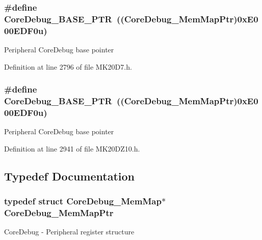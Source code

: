 \subsubsection[{\texorpdfstring{Core\+Debug\+\_\+\+B\+A\+S\+E\+\_\+\+P\+TR}{CoreDebug_BASE_PTR}}]{\setlength{\rightskip}{0pt plus 5cm}\#define Core\+Debug\+\_\+\+B\+A\+S\+E\+\_\+\+P\+TR~(({\bf Core\+Debug\+\_\+\+Mem\+Map\+Ptr})0x\+E000\+E\+D\+F0u)}\hypertarget{group___core_debug___peripheral_ga994a185afca30ede538d89322c4f0326}{}\label{group___core_debug___peripheral_ga994a185afca30ede538d89322c4f0326}
Peripheral Core\+Debug base pointer 

Definition at line 2796 of file M\+K20\+D7.\+h.

\subsubsection[{\texorpdfstring{Core\+Debug\+\_\+\+B\+A\+S\+E\+\_\+\+P\+TR}{CoreDebug_BASE_PTR}}]{\setlength{\rightskip}{0pt plus 5cm}\#define Core\+Debug\+\_\+\+B\+A\+S\+E\+\_\+\+P\+TR~(({\bf Core\+Debug\+\_\+\+Mem\+Map\+Ptr})0x\+E000\+E\+D\+F0u)}\hypertarget{group___core_debug___peripheral_ga994a185afca30ede538d89322c4f0326}{}\label{group___core_debug___peripheral_ga994a185afca30ede538d89322c4f0326}
Peripheral Core\+Debug base pointer 

Definition at line 2941 of file M\+K20\+D\+Z10.\+h.



\subsection{Typedef Documentation}
\subsubsection[{\texorpdfstring{Core\+Debug\+\_\+\+Mem\+Map\+Ptr}{CoreDebug_MemMapPtr}}]{\setlength{\rightskip}{0pt plus 5cm}typedef struct {\bf Core\+Debug\+\_\+\+Mem\+Map}$\ast$ {\bf Core\+Debug\+\_\+\+Mem\+Map\+Ptr}}\hypertarget{group___core_debug___peripheral_gaa548220bc91b12bd49065fe752579fcd}{}\label{group___core_debug___peripheral_gaa548220bc91b12bd49065fe752579fcd}
Core\+Debug -\/ Peripheral register structure 
